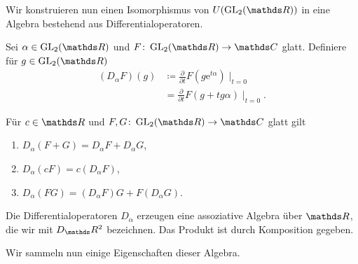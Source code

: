 Wir konstruieren nun einen Isomorphismus von $U(\GL_2(\R))$ in eine Algebra bestehend aus Differentialoperatoren.

\begin{defi}
Sei $\alpha \in \GL_2(\R)$ und $F \colon \GL_2(\R) \to \C$ glatt. Definiere für $g \in \GL_2(\R)$
\begin{align*}
(D_\alpha F)(g)&\coloneqq \frac{\partial}{\partial t} F(g\mathrm{e}^{t\alpha}) \mid_{t=0}\\
&=\frac{\partial}{\partial t} F(g+tg\alpha)\mid_{t=0}.
\end{align*}
\end{defi}

\begin{prop}
Für $c\in \R$ und $F, G \colon \GL_2(\R) \to \C$ glatt gilt
\begin{enumerate}[label=(\roman*)]
\item $D_\alpha(F+G)=D_\alpha F+ D_\alpha G$,
\item $D_\alpha(cF)=c(D_\alpha F)$,
\item $D_\alpha(FG)=(D_\alpha F)G+F(D_\alpha G)$.
\end{enumerate}
\end{prop}

\begin{defi}
Die Differentialoperatoren $D_\alpha$ erzeugen eine assoziative Algebra
über $\R$, die wir mit $D_\R^2$ bezeichnen.
Das Produkt ist durch Komposition gegeben.
\end{defi}

Wir sammeln nun einige Eigenschaften dieser Algebra.

